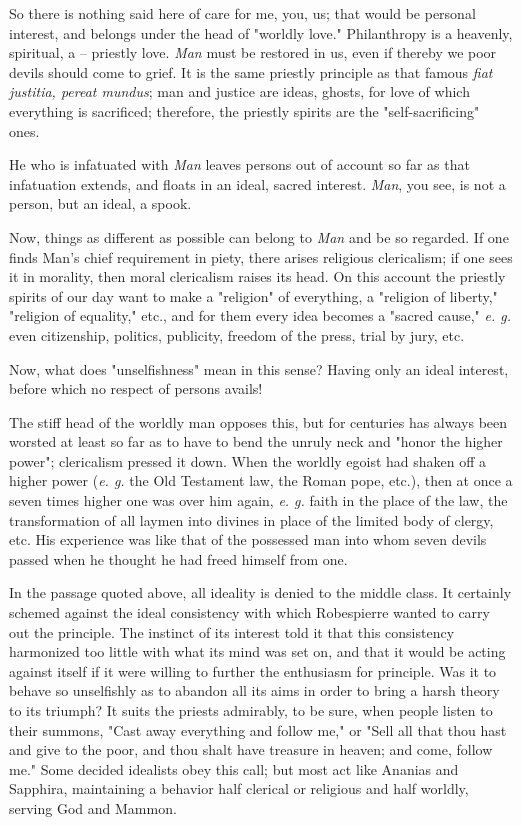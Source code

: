 So there is nothing said here of care for me, you, us; that would be personal 
interest, and belongs under the head of "{}worldly love."{} Philanthropy is a 
heavenly, spiritual, a -- priestly love. \textit{Man} must be restored in us, 
even if thereby we poor devils should come to grief. It is the same priestly 
principle as that famous \textit{fiat justitia, pereat mundus}; man and 
justice are ideas, ghosts, for love of which everything is sacrificed; 
therefore, the priestly spirits are the "{}self-sacrificing"{} ones.

He who is infatuated with \textit{Man} leaves persons out of account so far as 
that infatuation extends, and floats in an ideal, sacred interest. 
\textit{Man}, you see, is not a person, but an ideal, a spook.

Now, things as different as possible can belong to \textit{Man} and be so 
regarded. If one finds Man's chief requirement in piety, there arises 
religious clericalism; if one sees it in morality, then moral clericalism 
raises its head. On this account the priestly spirits of our day want to make 
a "{}religion"{} of everything, a "{}religion of liberty,"{} "{}religion of 
equality,"{} etc., and for them every idea becomes a "{}sacred cause,"{} 
\textit{e. g.} even citizenship, politics, publicity, freedom of the press, 
trial by jury, etc.

Now, what does "{}unselfishness"{} mean in this sense? Having only an ideal 
interest, before which no respect of persons avails!

The stiff head of the worldly man opposes this, but for centuries has always 
been worsted at least so far as to have to bend the unruly neck and "{}honor 
the higher power"{}; clericalism pressed it down. When the worldly egoist had 
shaken off a higher power (\textit{e. g.} the Old Testament law, the Roman 
pope, etc.), then at once a seven times higher one was over him again, 
\textit{e. g.} faith in the place of the law, the transformation of all laymen 
into divines in place of the limited body of clergy, etc. His experience was 
like that of the possessed man into whom seven devils passed when he thought 
he had freed himself from one.

In the passage quoted above, all ideality is denied to the middle class. It 
certainly schemed against the ideal consistency with which Robespierre wanted 
to carry out the principle. The instinct of its interest told it that this 
consistency harmonized too little with what its mind was set on, and that it 
would be acting against itself if it were willing to further the enthusiasm 
for principle. Was it to behave so unselfishly as to abandon all its aims in 
order to bring a harsh theory to its triumph? It suits the priests admirably, 
to be sure, when people listen to their summons, "{}Cast away everything and 
follow me,"{} or "{}Sell all that thou hast and give to the poor, and thou 
shalt have treasure in heaven; and come, follow me."{} Some decided idealists 
obey this call; but most act like Ananias and Sapphira, maintaining a behavior 
half clerical or religious and half worldly, serving God and Mammon.

